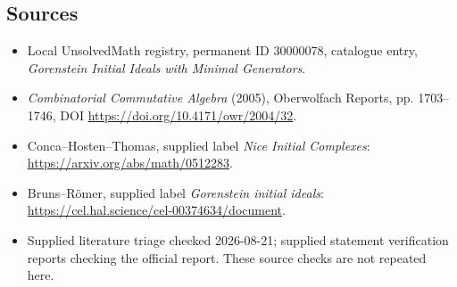 \documentclass[11pt]{article}
\begin{document}
\subsection{Sources}
\begin{itemize}
\item Local UnsolvedMath registry, permanent ID 30000078, catalogue entry, \emph{Gorenstein Initial Ideals with Minimal Generators}.
\item \emph{Combinatorial Commutative Algebra} (2005), Oberwolfach Reports, pp. 1703--1746, DOI \url{https://doi.org/10.4171/owr/2004/32}.
\item Conca--Hosten--Thomas, supplied label \emph{Nice Initial Complexes}: \url{https://arxiv.org/abs/math/0512283}.
\item Bruns--R\"omer, supplied label \emph{Gorenstein initial ideals}: \url{https://cel.hal.science/cel-00374634/document}.
\item Supplied literature triage checked 2026-08-21; supplied statement verification reports checking the official report. These source checks are not repeated here.
\end{itemize}
\end{document}
